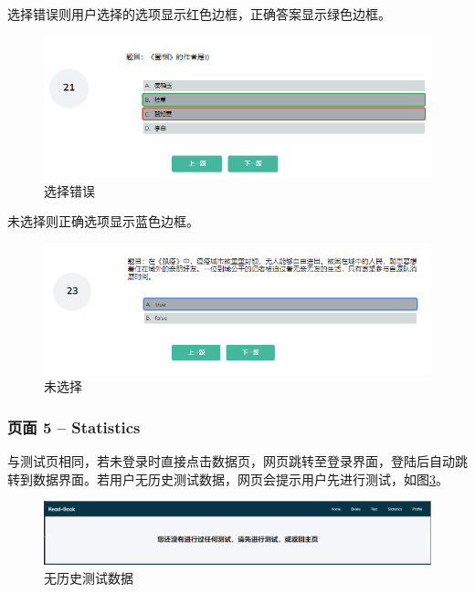 \documentclass[twoside,11pt]{article}
\begin{document}
选择错误则用户选择的选项显示红色边框，正确答案显示绿色边框。

\begin{figure}[H]
    \centering
    \includegraphics[width=0.8\columnwidth]{figures/testError.png}
    \caption{选择错误}\label{fig:testError}
\end{figure}

未选择则正确选项显示蓝色边框。

\begin{figure}[H]
    \centering
    \includegraphics[width=0.8\columnwidth]{figures/testEmpty.png}
    \caption{未选择}\label{fig:testEmpty}
\end{figure}

\subsubsection{页面 5 -- Statistics}

与测试页相同，若未登录时直接点击数据页，网页跳转至登录界面，登陆后自动跳转到数据界面。若用户无历史测试数据，网页会提示用户先进行测试，如图\ref{fig:noTest}。


\begin{figure}[H]
    \centering
    \includegraphics[width=1\columnwidth]{figures/noTest.png}
    \caption{无历史测试数据}\label{fig:noTest}
\end{figure}
\end{document}
